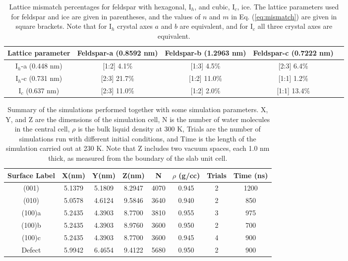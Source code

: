 \documentclass[preprint,aps,prb,floatfix]{revtex4-1}
\begin{document}


\clearpage


\begin{table}[]
\centering

\begin{tabular}{ccccc}

Lattice parameter & Feldspar-a (0.8592 nm) & Feldspar-b (1.2963 nm) & Feldspar-c (0.7222 nm) \\ \hline
I$_{h}$-a (0.448 nm) & [1:2] 4.1\% & [1:3] 4.5\% & [2:3] 6.4\% \\
I$_{h}$-c (0.731 nm) & [2:3] 21.7\% & [1:2] 11.0\% & [1:1] 1.2\% \\
I$_{c}$ (0.637 nm) & [2:3] 11.0\% & [1:2] 2.0\% & [1:1] 13.4\%

\end{tabular}
\caption{Lattice mismatch percentages for feldspar with hexagonal, I$_{h}$, and cubic, I$_{c}$, ice. The lattice parameters used for feldspar and ice are given in parentheses, and the values of $n$ and $m$ in Eq. (\ref{eq:mismatch}) are given in square brackets. Note that for I$_{h}$ crystal axes $a$ and $b$ are equivalent, and for I$_{c}$ all three crystal axes are equivalent.}
\label{tab:latticematch}
\end{table}

\begin{table}[]
\centering

\begin{tabular}{cccccccc}

Surface Label & X(nm)  & Y(nm)  & Z(nm)  & N           & $\rho$ (g/cc)       &   Trials         & Time (ns) \\ \hline
(001)   & 5.1379 & 5.1809 & 8.2947 & 4070            & 0.945         & 2           & 1200              \\
(010)   & 5.0578 & 4.6124 & 9.5846 & 3640            & 0.940         & 2           & 850               \\ 
(100)a  & 5.2435 & 4.3903 & 8.7700 & 3810            & 0.955         & 3           & 975               \\
(100)b  & 5.2435 & 4.3903 & 8.9760 & 3600            & 0.950         & 2           & 700               \\
(100)c  & 5.2435 & 4.3903 & 8.7700 & 3600            & 0.945         & 4           & 900               \\
Defect  & 5.9942 & 6.4654 & 9.4122 & 5680            & 0.950         & 2           & 900              

\end{tabular}
\caption{Summary of the simulations performed together with some simulation parameters. X, Y, and Z are the dimensions of the simulation cell, N is the number of water molecules in the central cell, $\rho$ is the bulk liquid density at 300 K, Trials are the number of simulations run with different initial conditions, and Time is the length of the simulation carried out at 230 K. Note that Z includes two vacuum spaces, each 1.0 nm thick, as measured from the boundary of the slab unit cell.}
\label{tab:simsummary}
\end{table}
\end{document}
